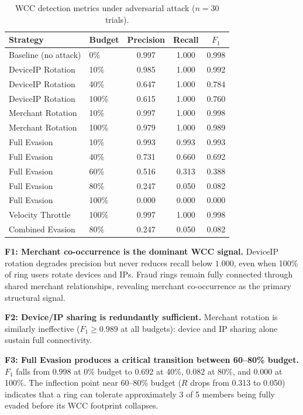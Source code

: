 \documentclass[sigconf,nonacm]{acmart}
\newcommand{\wcc}{\textsc{WCC}\xspace}
\begin{document}
\begin{table}[h]
\caption{WCC detection metrics under adversarial attack ($n=30$ trials).}
\label{tab:adversarial}
\centering
\small
\begin{tabular}{llccc}
\toprule
Strategy & Budget & Precision & Recall & $F_1$ \\
\midrule
Baseline (no attack) & 0\%   & 0.997 & 1.000 & 0.998 \\
\midrule
DeviceIP Rotation    & 10\%  & 0.985 & 1.000 & 0.992 \\
DeviceIP Rotation    & 40\%  & 0.647 & 1.000 & 0.784 \\
DeviceIP Rotation    & 100\% & 0.615 & 1.000 & 0.760 \\
\midrule
Merchant Rotation    & 10\%  & 0.997 & 1.000 & 0.998 \\
Merchant Rotation    & 100\% & 0.979 & 1.000 & 0.989 \\
\midrule
Full Evasion         & 10\%  & 0.993 & 0.993 & 0.993 \\
Full Evasion         & 40\%  & 0.731 & 0.660 & 0.692 \\
Full Evasion         & 60\%  & 0.516 & 0.313 & 0.388 \\
Full Evasion         & 80\%  & 0.247 & 0.050 & 0.082 \\
Full Evasion         & 100\% & 0.000 & 0.000 & 0.000 \\
\midrule
Velocity Throttle    & 100\% & 0.997 & 1.000 & 0.998 \\
Combined Evasion     & 80\%  & 0.247 & 0.050 & 0.082 \\
\bottomrule
\end{tabular}
\end{table}

\noindent\textbf{F1: Merchant co-occurrence is the dominant \wcc signal.}
DeviceIP rotation degrades precision but never reduces recall below
$1.000$, even when 100\% of ring users rotate devices and IPs.  Fraud rings
remain fully connected through shared merchant relationships, revealing
merchant co-occurrence as the primary structural signal.

\noindent\textbf{F2: Device/IP sharing is redundantly sufficient.}
Merchant rotation is similarly ineffective ($F_1 \geq 0.989$ at all
budgets): device and IP sharing alone sustain full connectivity.

\noindent\textbf{F3: Full Evasion produces a critical transition between
60--80\% budget.}  $F_1$ falls from 0.998 at 0\% budget to 0.692 at 40\%,
0.082 at 80\%, and 0.000 at 100\%.  The inflection point near 60--80\%
budget ($R$ drops from 0.313 to 0.050) indicates that a ring can tolerate
approximately 3 of 5 members being fully evaded before its \wcc footprint
collapses.
\end{document}
